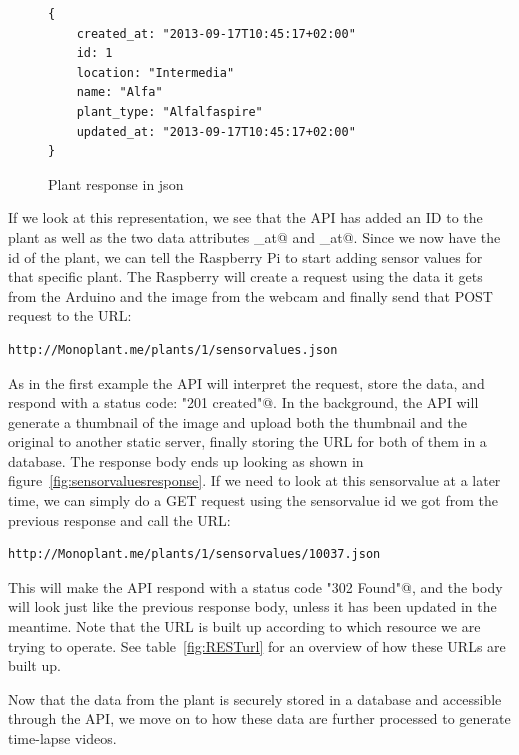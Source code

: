 \begin{figure}
	\begin{lstlisting}[style=htmlcssjs]
{
	created_at: "2013-09-17T10:45:17+02:00"
	id: 1
	location: "Intermedia"
	name: "Alfa"
	plant_type: "Alfalfaspire"
	updated_at: "2013-09-17T10:45:17+02:00"
}
	\end{lstlisting}
	\caption{Plant response in json}
	\label{fig:plantresponse}
\end{figure}

If we look at this representation, we see that the API has added an ID to the plant as well as the two data attributes \verb@created_at@ and \verb@updated_at@. Since we now have the id of the plant, we can tell the Raspberry Pi to start adding sensor values for that specific plant. The Raspberry will create a request using the data it gets from the Arduino and the image from the webcam and finally send that POST request to the URL:\begin{verbatim}http://Monoplant.me/plants/1/sensorvalues.json \end{verbatim}

As in the first example the API will interpret the request, store the data, and respond with a status code: \verb@"201 created"@. In the background, the API will generate a thumbnail of the image and upload both the thumbnail and the original to another static server, finally storing the URL for both of them in a database. The response body ends up looking as shown in figure~\ref{fig:sensorvaluesresponse}. If we need to look at this sensorvalue at a later time, we can simply do a GET request using the sensorvalue id we got from the previous response and call the URL:\begin{verbatim}http://Monoplant.me/plants/1/sensorvalues/10037.json \end{verbatim} This will make the API respond with a status code \verb@"302 Found"@, and the body will look just like the previous response body, unless it has been updated in the meantime. Note that the URL is built up according to which resource we are trying to operate. See table~\ref{fig:RESTurl} for an overview of how these URLs are built up.

Now that the data from the plant is securely stored in a database and accessible through the API, we move on to how these data are further processed to generate time-lapse videos. 

